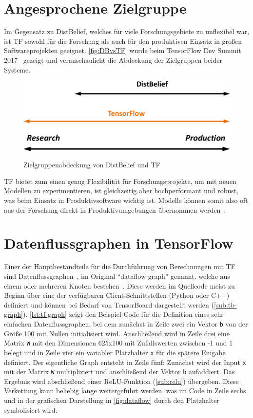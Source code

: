 \section{Angesprochene Zielgruppe}
Im Gegensatz zu DistBelief, welches für viele Forschungsgebiete zu unflexibel war, ist \gls{TF} sowohl für die Forschung als auch für den produktiven Einsatz in großen Softwareprojekten geeignet. \autoref{fig:DBvsTF} wurde beim TensorFlow Dev Summit 2017~\cite{tf-sum17-keynote} gezeigt und veranschaulicht die Abdeckung der Zielgruppen beider Systeme.

\vspace{0.3cm}
\begin{figure}[htb!]
	\centering
	 \includegraphics[width=.7\textwidth]{images/DistBeliefvsTensorFlow.pdf}\\
	\vspace{10pt} 
	\caption{Zielgruppenabdeckung von DistBelief und \gls{TF}~\cite{tf-sum17-keynote}}
	\label{fig:DBvsTF}
\end{figure}

\gls{TF} bietet zum einen genug Flexibilität für Forschungsprojekte, um mit neuen Modellen zu experimentieren, ist gleichzeitig aber hochperformant und robust, was beim Einsatz in Produktivsoftware wichtig ist. Modelle können somit also oft aus der Forschung direkt in Produktivumgebungen übernommen werden~\cite{tensorflow2016-whitepaper}.

\section{Datenflussgraphen in TensorFlow}
Einer der Hauptbestandteile für die Durchführung von Berechnungen mit \gls{TF} sind Datenflussgraphen~\cite{dataflow}, im Original "`dataflow graph"' genannt, welche aus einem oder mehreren Knoten bestehen~\cite{tensorflow2015-whitepaper}. Diese werden im Quellcode meist zu Beginn über eine der verfügbaren Client-Schnittstellen (Python oder C++) definiert und können bei Bedarf von TensorBoard dargestellt werden (\autoref{sub:tb-graph}). \autoref{lst:tf-graph} zeigt den Beispiel-Code für die Definition eines sehr einfachen Datenflussgraphen, bei dem zunächst in Zeile zwei ein Vektor \lstinline$b$ von der Größe 100 mit Nullen initialisiert wird. Anschließend wird in Zeile drei eine Matrix \lstinline$W$ mit den Dimensionen 625x100 mit Zufallswerten zwischen -1 und 1 belegt und in Zeile vier ein variabler Platzhalter \lstinline$x$ für die spätere Eingabe definiert. Der eigentliche Graph entsteht in Zeile fünf: Zunächst wird der Input \lstinline$x$ mit der Matrix \lstinline$W$ multipliziert und anschließend der Vektor \lstinline$b$ aufaddiert. Das Ergebnis wird abschließend einer \gls{ReLU}-Funktion (\autoref{sub:relu}) übergeben. Diese Verkettung kann beliebig lange weitergeführt werden, was im Code in Zeile sechs und in der grafischen Darstellung in \autoref{fig:dataflow} durch den Platzhalter symbolisiert wird.


